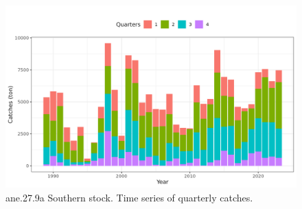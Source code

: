 \documentclass[
]{article}
\begin{document}
\begin{figure}[H]

{\centering \includegraphics[width=0.95\linewidth]{report/run/S1.0_4FLEETS_SelECO_RecIndex_Mnewfix/fig_catches} 

}

\caption{ane.27.9a Southern stock. Time series of quarterly catches.}\label{fig:unnamed-chunk-3}
\end{figure}
\end{document}
